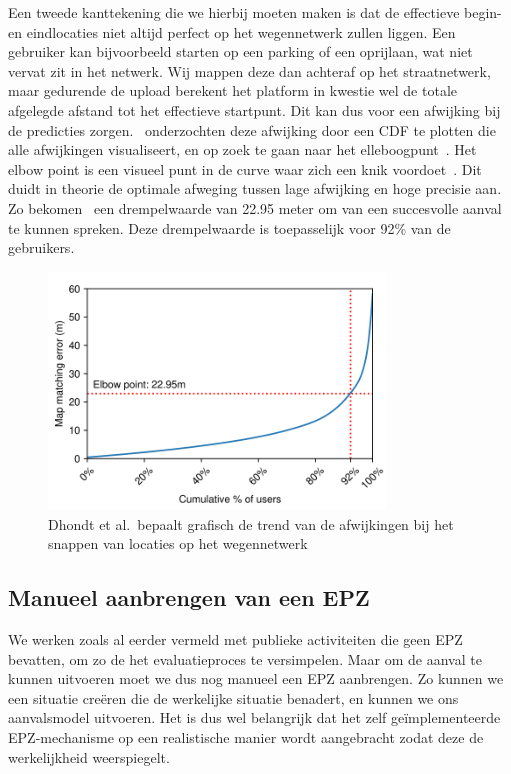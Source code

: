 Een tweede kanttekening die we hierbij moeten maken is dat de effectieve begin-
en eindlocaties niet altijd perfect op het wegennetwerk zullen liggen. Een
gebruiker kan bijvoorbeeld starten op een parking of een oprijlaan, wat niet
vervat zit in het netwerk. Wij mappen deze dan achteraf op het straatnetwerk,
maar gedurende de upload berekent het platform in kwestie wel de totale
afgelegde afstand tot het effectieve startpunt. Dit kan dus voor een afwijking
bij de predicties zorgen.~\citeauthor{Dhondt} onderzochten deze afwijking door
een \ac{CDF} te plotten die alle afwijkingen visualiseert, en op zoek te gaan
naar het elleboogpunt~\cite{Dhondt}. Het elbow point is een visueel punt in de
curve waar zich een knik voordoet~\cite{Introduc22:online}. Dit duidt in
theorie de optimale afweging tussen lage afwijking en hoge precisie aan. Zo
bekomen~\citeauthor{Dhondt} een drempelwaarde van 22.95 meter om van een
succesvolle aanval te kunnen spreken. Deze drempelwaarde is toepasselijk voor
92\% van de gebruikers.
\begin{figure}[h]
    \centering
    \includegraphics[width=0.8\textwidth]{fig/Afwijkingen&Analyses/OvershootMappingDistance.png}
    \caption{Dhondt et al.\ bepaalt grafisch de trend van de afwijkingen bij het snappen van locaties op het wegennetwerk~\cite{Dhondt}}\label{fig:overshootMappingDistance}
\end{figure}

\subsection{Manueel aanbrengen van een EPZ}\label{sec:zelf_cloaking}
We werken zoals al eerder vermeld met publieke activiteiten die geen \ac{EPZ}
bevatten, om zo de het evaluatieproces te versimpelen. Maar om de aanval te
kunnen uitvoeren moet we dus nog manueel een \ac{EPZ} aanbrengen. Zo kunnen we
een situatie creëren die de werkelijke situatie benadert, en kunnen we ons
aanvalsmodel uitvoeren. Het is dus wel belangrijk dat het zelf geïmplementeerde
\ac{EPZ}-mechanisme op een realistische manier wordt aangebracht zodat deze de
werkelijkheid weerspiegelt.

